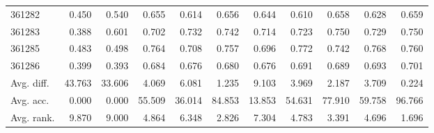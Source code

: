 \begin{tabular}{lrrrrrrrrrr}
361282 & 0.450 & 0.540 & 0.655 & 0.614 & 0.656 & 0.644 & 0.610 & 0.658 & 0.628 & 0.659 \\
361283 & 0.388 & 0.601 & 0.702 & 0.732 & 0.742 & 0.714 & 0.723 & 0.750 & 0.729 & 0.750 \\
361285 & 0.483 & 0.498 & 0.764 & 0.708 & 0.757 & 0.696 & 0.772 & 0.742 & 0.768 & 0.760 \\
361286 & 0.399 & 0.393 & 0.684 & 0.676 & 0.680 & 0.676 & 0.691 & 0.689 & 0.693 & 0.701 \\
Avg. diff. & 43.763 & 33.606 & 4.069 & 6.081 & 1.235 & 9.103 & 3.969 & 2.187 & 3.709 & 0.224 \\
Avg. acc. & 0.000 & 0.000 & 55.509 & 36.014 & 84.853 & 13.853 & 54.631 & 77.910 & 59.758 & 96.766 \\
Avg. rank. & 9.870 & 9.000 & 4.864 & 6.348 & 2.826 & 7.304 & 4.783 & 3.391 & 4.696 & 1.696 \\
\bottomrule
\end{tabular}
